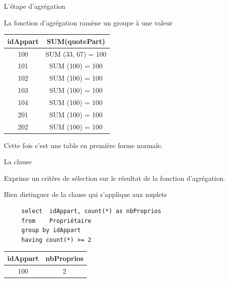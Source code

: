 \begin{frame}[fragile]{L'étape d'agrégation}

La fonction d'agrégation ramène un groupe à une valeur
\vfill

\begin{tabular}{c|c}
\textbf{idAppart} & SUM(\textbf{quotePart}) \\ \hline 
100 & SUM (33, 67) = 100 \\ \hline 
101 &  SUM (100) = 100\\ \hline 
102 &  SUM (100) = 100\\ \hline  
103 &  SUM (100) = 100\\ \hline 
104 &  SUM (100) = 100\\ \hline  
201 &  SUM (100) = 100\\ \hline  
202 & SUM (100) = 100\\ \hline  
\end{tabular}

\vfill
\begin{blocgauche}
\alert{Cette fois c'est une table en première forme normale.}
\end{blocgauche}
\end{frame}


\begin{frame}[fragile]{La clause }

Exprime un critère de sélection sur le résultat de la fonction d'agrégation.
\vfill

\alert{Bien distinguer de la clause  qui s'applique aux nuplets}

\vfill

\begin{verbatim}
     select  idAppart, count(*) as nbProprios
     from    Propriétaire
     group by idAppart
     having count(*) >= 2
\end{verbatim}

\vfill

\begin{tabular}{c|c}
\textbf{idAppart} & \textbf{nbProprios}\\ \hline 
100 & 2\\ \hline 
\end{tabular}

\end{frame}

